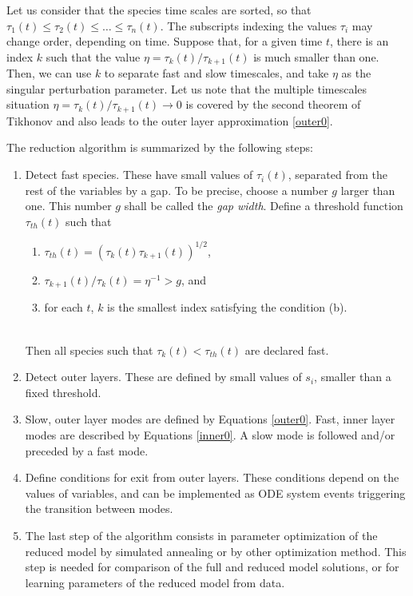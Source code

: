 \documentclass{llncs}
\begin{document}
Let us consider that the species time scales are sorted, so that $\tau_1(t) \leq \tau_2(t) \leq \ldots \leq \tau_n(t)$.
The subscripts indexing the values $\tau_i$ may change order, depending on time.
Suppose that, for a given time $t$, there is an index $k$ such that the value
$\eta = \tau_k(t)/\tau_{k+1}(t)$ is much smaller than one.
Then, we can use $k$ to separate fast and slow timescales, and take $\eta$ as the
singular perturbation parameter. Let us note that the multiple timescales
situation $\eta = \tau_k(t)/\tau_{k+1}(t) \to 0$ is covered by the second
theorem of Tikhonov \cite{tikhonov1952systems} and also leads to the outer
layer approximation \eqref{outer0}.

The reduction algorithm is summarized by the following steps:
\begin{enumerate}
\item
    Detect fast species. These have small values of $\tau_i(t)$, separated from
    the rest of the variables by a gap. To be precise,  {choose a number $g$ larger than one. This number $g$ shall be called the \textit{gap width}.}  Define a threshold
    function $\tau_{th}(t)$ such that\\[2pt]
	\null\hspace{3em}\begin{minipage}{0.9\textwidth}
	\begin{enumerate}
	\item $\tau_{th}(t) = (\tau_{k}(t) \tau_{k+1}(t))^{1/2}$,
	\item $\tau_{k+1}(t) / \tau_{k}(t) = \eta^{-1} > g$, and
	\item for each $t$, $k$ is the smallest index satisfying the condition (b).
	\end{enumerate}
	\end{minipage}\\[2pt]
	Then all species such that $\tau_{k}(t) <\tau_{th}(t)$ are declared fast.
\item
    Detect outer layers. These are defined by small values of $s_i$, smaller
    than a fixed threshold.
\item
    Slow, outer layer modes are defined by Equations \eqref{outer0}. Fast, inner
    layer modes are described by Equations \eqref{inner0}.  A slow mode is followed
    and/or preceded by a fast mode.
\item
	Define conditions for exit from outer layers. These conditions depend on
	the values of variables, and can be implemented as ODE system events
	triggering the transition between modes.
\item
	The last step of the algorithm consists in parameter optimization of the
	reduced model by simulated annealing or by other optimization method.
	 {This step is needed for comparison of the full and reduced model
	solutions, or for learning parameters of the reduced model from data.}
\end{enumerate}
\end{document}

